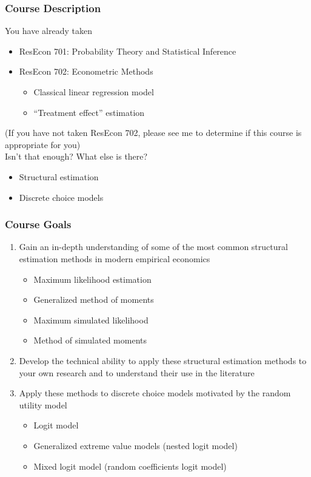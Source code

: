 \documentclass{beamer}
\begin{document}
\begin{frame}\frametitle{Course Description}
    You have already taken
    \begin{itemize}
        \item ResEcon 701: Probability Theory and Statistical Inference
        \item ResEcon 702: Econometric Methods
        \begin{itemize}
            \item Classical linear regression model
            \item ``Treatment effect'' estimation
        \end{itemize}
    \end{itemize}
    (If you have not taken ResEcon 702, please see me to determine if this course is appropriate for you) \\
    \vspace{3ex}
    Isn't that enough? What else is there?
    \begin{itemize}
        \item Structural estimation
        \item Discrete choice models
    \end{itemize}
\end{frame}

\begin{frame}\frametitle{Course Goals}
    \begin{enumerate}
        \item Gain an in-depth understanding of some of the most common structural estimation methods in modern empirical economics
        \begin{itemize}
            \item Maximum likelihood estimation
            \item Generalized method of moments
            \item Maximum simulated likelihood
            \item Method of simulated moments
        \end{itemize}
        \vspace{2ex} 
        \item Develop the technical ability to apply these structural estimation methods to your own research and to understand their use in the literature
        \vspace{2ex}
        \item Apply these methods to discrete choice models motivated by the random utility model
        \begin{itemize}
            \item Logit model
            \item Generalized extreme value models (nested logit model)
            \item Mixed logit model (random coefficients logit model)
        \end{itemize}
    \end{enumerate}
\end{frame}
\end{document}
